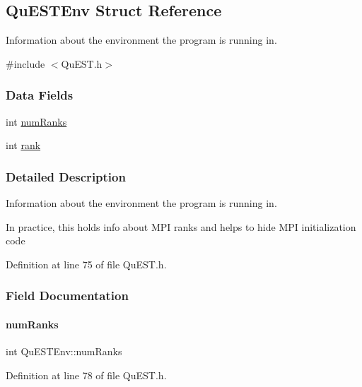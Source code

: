 \hypertarget{structQuESTEnv}{}\subsection{Qu\+E\+S\+T\+Env Struct Reference}
\label{structQuESTEnv}


Information about the environment the program is running in.  




{\ttfamily \#include $<$Qu\+E\+S\+T.\+h$>$}

\subsubsection*{Data Fields}
\begin{DoxyCompactItemize}
\item 
int \mbox{\hyperlink{structQuESTEnv_af22aacd7c9905accae28484785c193b4}{num\+Ranks}}
\item 
int \mbox{\hyperlink{structQuESTEnv_aa648bb336cf8598467cb62db00b9cee8}{rank}}
\end{DoxyCompactItemize}


\subsubsection{Detailed Description}
Information about the environment the program is running in. 

In practice, this holds info about M\+PI ranks and helps to hide M\+PI initialization code 

Definition at line 75 of file Qu\+E\+S\+T.\+h.



\subsubsection{Field Documentation}
\mbox{\label{structQuESTEnv_af22aacd7c9905accae28484785c193b4}} 
\paragraph{\texorpdfstring{num\+Ranks}{numRanks}}
{\footnotesize\ttfamily int Qu\+E\+S\+T\+Env\+::num\+Ranks}



Definition at line 78 of file Qu\+E\+S\+T.\+h.



